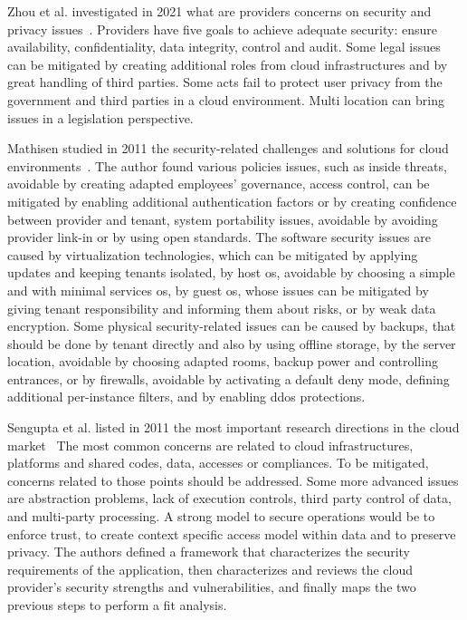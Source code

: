 Zhou et al. investigated in 2021 what are providers concerns on security and privacy issues~\cite{zhou_security_2010}. Providers have five goals to achieve adequate security: ensure availability, confidentiality, data integrity, control and audit. Some legal issues can be mitigated by creating additional roles from \gls{cloud} infrastructures and by great handling of third parties. Some acts fail to protect user privacy from the  government and third parties in a \gls{cloud} environment. Multi location can bring issues in a legislation perspective. %

Mathisen studied in 2011 the security-related challenges and solutions for \gls{cloud} environments~\cite{mathisen_security_2011}. The author found various policies issues, such as inside threats, avoidable by creating adapted employees' governance, access control, can be mitigated by enabling additional authentication factors or by creating confidence between provider and tenant, system portability issues, avoidable by avoiding provider link-in or by using open standards. The software security issues are caused by virtualization technologies, which can be mitigated by applying updates and keeping tenants isolated, by host \gls{os}, avoidable by choosing a simple and with minimal services \gls{os}, by guest \gls{os}, whose issues can be mitigated by giving tenant responsibility and informing them about risks, or by weak data encryption. Some physical security-related issues can be caused by backups, that should be done by tenant directly and also by using offline storage, by the server location, avoidable by choosing adapted rooms, backup power and controlling entrances, or by firewalls, avoidable by activating a default deny mode, defining additional per-instance filters, and by enabling \gls{ddos} protections. %

Sengupta et al. listed in 2011 the most important research directions in the \gls{cloud} market~\cite{sengupta_cloud_2011} The most common concerns are related to cloud infrastructures, platforms and shared codes, data, accesses or compliances. To be mitigated, concerns related to those points should be addressed. Some more advanced issues are abstraction problems, lack of execution controls, third party control of data, and multi-party processing. A strong model to secure operations would be to enforce trust, to create context specific access model within data and to preserve privacy. The authors defined a \gls{framework} that characterizes the security requirements of the application, then characterizes and reviews the cloud provider's security strengths and vulnerabilities, and finally maps the two previous steps to perform a fit analysis. %

